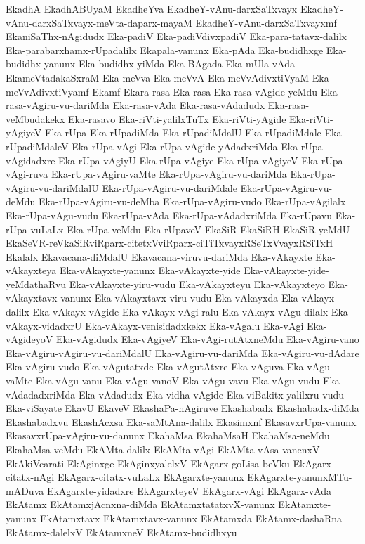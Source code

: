 {EkadhA
EkadhABUyaM
EkadheYva
EkadheY-vAnu-darxSaTxvayx
EkadheY-vAnu-darxSaTxvayx-meVta-daparx-mayaM
EkadheY-vAnu-darxSaTxvayxmf
EkaniSaThx-nAgidudx
Eka-padiV
Eka-padiVdivxpadiV
Eka-para-tatavx-dalilx
Eka-parabarxhamx-rUpadalilx
Ekapala-vanunx
Eka-pAda
Eka-budidhxge
Eka-budidhx-yanunx
Eka-budidhx-yiMda
Eka-BAgada
Eka-mUla-vAda
EkameVtadakaSxraM
Eka-meVva
Eka-meVvA
Eka-meVvAdivxtiVyaM
Eka-meVvAdivxtiVyamf
Ekamf
Ekara-rasa
Eka-rasa
Eka-rasa-vAgide-yeMdu
Eka-rasa-vAgiru-vu-dariMda
Eka-rasa-vAda
Eka-rasa-vAdadudx
Eka-rasa-veMbudakekx
Eka-rasavo
Eka-riVti-yalilxTuTx
Eka-riVti-yAgide
Eka-riVti-yAgiyeV
Eka-rUpa
Eka-rUpadiMda
Eka-rUpadiMdalU
Eka-rUpadiMdale
Eka-rUpadiMdaleV
Eka-rUpa-vAgi
Eka-rUpa-vAgide-yAdadxriMda
Eka-rUpa-vAgidadxre
Eka-rUpa-vAgiyU
Eka-rUpa-vAgiye
Eka-rUpa-vAgiyeV
Eka-rUpa-vAgi-ruva
Eka-rUpa-vAgiru-vaMte
Eka-rUpa-vAgiru-vu-dariMda
Eka-rUpa-vAgiru-vu-dariMdalU
Eka-rUpa-vAgiru-vu-dariMdale
Eka-rUpa-vAgiru-vu-deMdu
Eka-rUpa-vAgiru-vu-deMba
Eka-rUpa-vAgiru-vudo
Eka-rUpa-vAgilalx
Eka-rUpa-vAgu-vudu
Eka-rUpa-vAda
Eka-rUpa-vAdadxriMda
Eka-rUpavu
Eka-rUpa-vuLaLx
Eka-rUpa-veMdu
Eka-rUpaveV
EkaSiR
EkaSiRH
EkaSiR-yeMdU
EkaSeVR-reVkaSiRviRparx-citetxVviRparx-ciTiTxvayxRSeTxVvayxRSiTxH
Ekalalx
Ekavacana-diMdalU
Ekavacana-viruvu-dariMda
Eka-vAkayxte
Eka-vAkayxteya
Eka-vAkayxte-yanunx
Eka-vAkayxte-yide
Eka-vAkayxte-yide-yeMdathaRvu
Eka-vAkayxte-yiru-vudu
Eka-vAkayxteyu
Eka-vAkayxteyo
Eka-vAkayxtavx-vanunx
Eka-vAkayxtavx-viru-vudu
Eka-vAkayxda
Eka-vAkayx-dalilx
Eka-vAkayx-vAgide
Eka-vAkayx-vAgi-ralu
Eka-vAkayx-vAgu-dilalx
Eka-vAkayx-vidadxrU
Eka-vAkayx-venisidadxkekx
Eka-vAgalu
Eka-vAgi
Eka-vAgideyoV
Eka-vAgidudx
Eka-vAgiyeV
Eka-vAgi-rutAtxneMdu
Eka-vAgiru-vano
Eka-vAgiru-vAgiru-vu-dariMdalU
Eka-vAgiru-vu-dariMda
Eka-vAgiru-vu-dAdare
Eka-vAgiru-vudo
Eka-vAgutatxde
Eka-vAgutAtxre
Eka-vAguva
Eka-vAgu-vaMte
Eka-vAgu-vanu
Eka-vAgu-vanoV
Eka-vAgu-vavu
Eka-vAgu-vudu
Eka-vAdadadxriMda
Eka-vAdadudx
Eka-vidha-vAgide
Eka-viBakitx-yalilxru-vudu
Eka-viSayate
EkavU
EkaveV
EkashaPa-nAgiruve
Ekashabadx
Ekashabadx-diMda
Ekashabadxvu
EkashAcxsa
Eka-saMtAna-dalilx
Ekasimxnf
EkasavxrUpa-vanunx
EkasavxrUpa-vAgiru-vu-danunx
EkahaMsa
EkahaMsaH
EkahaMsa-neMdu
EkahaMsa-veMdu
EkAMta-dalilx
EkAMta-vAgi
EkAMta-vAsa-vanenxV
EkAkiVcarati
EkAginxge
EkAginxyalelxV
EkAgarx-goLisa-beVku
EkAgarx-citatx-nAgi
EkAgarx-citatx-vuLaLx
EkAgarxte-yanunx
EkAgarxte-yanunxMTu-mADuva
EkAgarxte-yidadxre
EkAgarxteyeV
EkAgarx-vAgi
EkAgarx-vAda
EkAtamx
EkAtamxjAcnxna-diMda
EkAtamxtatatxvX-vanunx
EkAtamxte-yanunx
EkAtamxtavx
EkAtamxtavx-vanunx
EkAtamxda
EkAtamx-dashaRna
EkAtamx-dalelxV
EkAtamxneV
EkAtamx-budidhxyu
}
